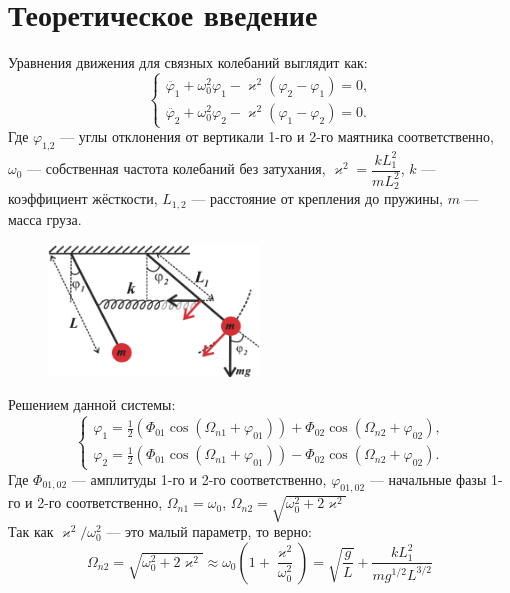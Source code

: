 \documentclass[a4paper]{article}
\begin{document}
\section{\textbf{Теоретическое введение}}
Уравнения движения для связных колебаний выглядит как:
\begin{equation}
    \begin{cases}
        \ddot{\varphi_1}+\omega_0^2\varphi_1-\varkappa^2(\varphi_2-\varphi_1)=0\text{,}\\
        \ddot{\varphi_2}+\omega_0^2\varphi_2-\varkappa^2(\varphi_1-\varphi_2)=0\text{.}
    \end{cases}
\end{equation}
Где $\varphi_{1\text{,} 2}$ --- углы отклонения от вертикали 1-го и 2-го маятника соответственно, $\omega_0$ --- собственная частота колебаний без затухания, $\varkappa^2=\dfrac{kL_1^2}{mL_2^2}$, $k$ --- коэффициент жёсткости, $L_{1, 2}$ --- расстояние от крепления до пружины, $m$ --- масса груза.\\
\begin{figure}[H]
    \center
    \includegraphics[width=0.5\textwidth]{pick_1.png}
\end{figure}
Решением данной системы:
\begin{equation}
    \begin{cases}
        \varphi_1=\frac{1}{2}(\Phi_{01}\cos(\Omega_{n1}+\varphi_{01}))+\Phi_{02}\cos(\Omega_{n2}+\varphi_{02})\text{,}\\
         \varphi_2=\frac{1}{2}(\Phi_{01}\cos(\Omega_{n1}+\varphi_{01}))-\Phi_{02}\cos(\Omega_{n2}+\varphi_{02})\text{.}
    \end{cases}
\end{equation}
Где $\Phi_{01, 02}$ --- амплитуды 1-го и 2-го соответственно, $\varphi_{01, 02}$ --- начальные фазы 1-го и 2-го соответственно, $\Omega_{n1}=\omega_0$, $\Omega_{n2}=\sqrt{\omega_0^2+2\varkappa^2}$\\
Так как $\varkappa^2/\omega_0^2$ --- это малый параметр, то верно:
\[
    \Omega_{n2}=\sqrt{\omega_0^2+2\varkappa^2} \approx \omega_0\left(1+\dfrac{\varkappa^2}{\omega_0^2}\right)=
    \sqrt{\dfrac{g}{L}}+\dfrac{kL_1^2}{mg^{1/2}L^{3/2}}
\]
\end{document}
